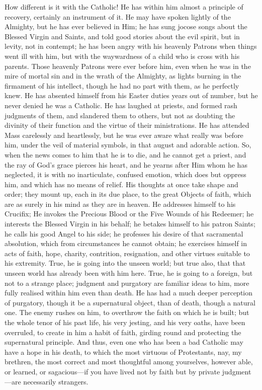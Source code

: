 How different is it with the Catholic! He has within him almost a
principle of recovery, certainly an instrument of it. He may have
spoken lightly of the Almighty, but he has ever believed in Him; he
has sung jocose songs about the Blessed Virgin and Saints, and told
good stories about the evil spirit, but in levity, not in contempt; he
has been angry with his heavenly Patrons when things went ill with
him, but with the waywardness of a child who is cross with his
parents. Those heavenly Patrons were ever before him, even when he was
in the mire of mortal sin and in the wrath of the Almighty, as lights
burning in the firmament of his intellect, though he had no part with
them, as he perfectly knew. He has absented himself from his Easter
duties years out of number, but he never denied he was a Catholic. He
has laughed at priests, and formed rash judgments of them, and
slandered them to others, but not as doubting the divinity of their
function and the virtue of their ministrations. He has attended Mass
carelessly and heartlessly, but he was ever aware what really was
before him, under the veil of material symbols, in that august and
adorable action. So, when the news comes to him that he is to die, and
he cannot get a priest, and the ray of God's grace pierces his heart,
and he yearns after Him whom he has neglected, it is with no inarticulate, confused emotion, which does but oppress him, and which
has no means of relief. His thoughts at once take shape and order;
they mount up, each in its due place, to the great Objects of faith,
which are as surely in his mind as they are in heaven. He addresses
himself to his Crucifix; He invokes the Precious Blood or the Five
Wounds of his Redeemer; he interests the Blessed Virgin in his
behalf; he betakes himself to his patron Saints; he calls his good
Angel to his side; he professes his desire of that sacramental
absolution, which from circumstances he cannot obtain; he exercises
himself in acts of faith, hope, charity, contrition, resignation, and
other virtues suitable to his extremity. True, he is going into the
unseen world; but true also, that that unseen world has already been
with him here. True, he is going to a foreign, but not to a strange
place; judgment and purgatory are familiar ideas to him, more fully
realised within him even than death. He has had a much deeper
perception of purgatory, though it be a supernatural object, than of
death, though a natural one. The enemy rushes on him, to overthrow the
faith on which he is built; but the whole tenor of his past life, his
very jesting, and his very oaths, have been overruled, to create in
him a habit of faith, girding round and protecting the supernatural
principle. And thus, even one who has been a bad Catholic may have a
hope in his death, to which the most virtuous of Protestants, nay, my
brethren, the most correct and most thoughtful among yourselves,
however able, or learned, or sagacious—if you have lived not by faith
but by private judgment—are necessarily strangers.

